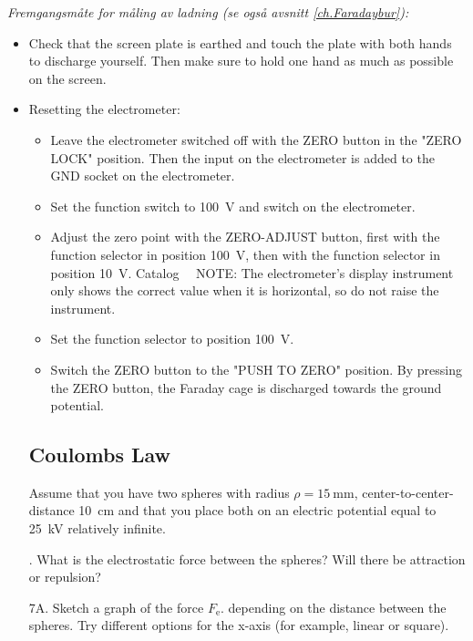 \documentclass[../Elmag-labhefte-2022.tex]{subfiles}
\begin{document}
\emph{Fremgangsmåte for måling av ladning (se også avsnitt \ref{ch.Faradaybur}):}
\vspace{-4mm}
\begin{itemize}
    \item Check that the screen plate is earthed and touch the plate with both hands to discharge yourself. Then make sure to hold one hand as much as possible on the screen.
    \item Resetting the electrometer:
    \vspace{-2mm}
    \begin{itemize}
        \item Leave the electrometer switched off with the ZERO button in the "ZERO LOCK" position. Then the input on the electrometer is added to the GND socket on the electrometer.
        \item Set the function switch to \SI{100}{\volt} and switch on the electrometer.
        \item Adjust the zero point with the ZERO-ADJUST button, first with the function selector in position \SI{100}{\volt}, then with the function selector in position \SI{10}{\volt}. Catalog \ \
        NOTE: The electrometer's display instrument only shows the correct value when it is horizontal, so do not raise the instrument.
        \item Set the function selector to position \SI{100}{\volt}.
        \item Switch the ZERO button to the "PUSH TO ZERO" position. By pressing the ZERO button, the Faraday cage is discharged towards the ground potential.
    \end{itemize}

\subsection{Coulombs Law \label{ch.coulomb.beregn.coulomb}}

Assume that you have two spheres with radius $\rho = \SI{15}{\milli\m}$, center-to-center-distance \SI{10}{\cm} and that you place both on an electric potential equal to \SI{25}{\kilo\volt} relatively infinite.

{. What is the electrostatic force between the spheres? Will there be attraction or repulsion?}


{\itsf 7A. Sketch a graph of the force $F_\text{e}$. depending on the distance between the spheres.} Try different options for the x-axis (for example, linear or square).


\end{itemize}
\end{document}
